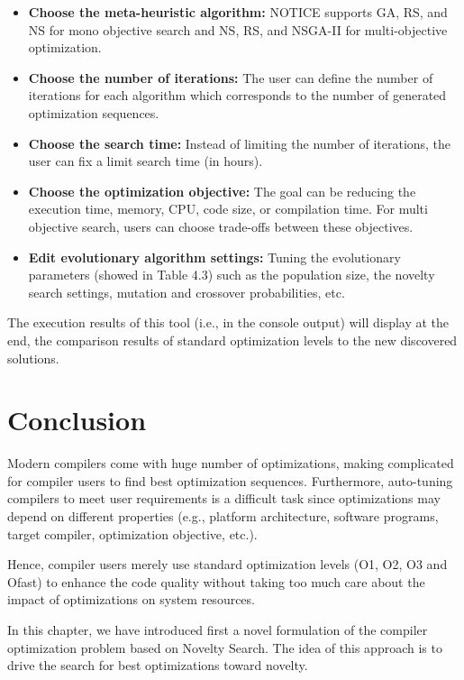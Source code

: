 \begin{itemize}
	\item \textbf{Choose the meta-heuristic algorithm:} NOTICE supports GA, RS, and NS for mono objective search and NS, RS, and NSGA-II for multi-objective optimization.
 	
	\item \textbf{Choose the number of iterations:} The user can define the number of iterations for each algorithm which corresponds to the number of generated optimization sequences.

	\item \textbf{Choose the search time:} Instead of limiting the number of iterations, the user can fix a limit search time (in hours). 
	
	\item \textbf{Choose the optimization objective:} The goal can be reducing the execution time, memory, CPU, code size, or compilation time. For multi objective search, users can choose trade-offs between these objectives.
	
	\item \textbf{Edit evolutionary algorithm settings:} Tuning the evolutionary parameters (showed in Table 4.3) such as the population size, the novelty search settings, mutation and crossover probabilities, etc.
\end{itemize} 


The execution results of this tool (i.e., in the console output) will display at the end, the comparison results of standard optimization levels to the new discovered solutions.

\section{Conclusion}
Modern compilers come with huge number of optimizations, making complicated for compiler users to find best optimization sequences. Furthermore, auto-tuning compilers to meet user requirements is a difficult task since optimizations may depend on different properties (e.g., platform architecture, software programs, target compiler, optimization objective, etc.).

Hence, compiler users merely use standard optimization levels (O1, O2, O3 and Ofast) to enhance the code quality without taking too much care about the impact of optimizations on system resources.

In this chapter, we have introduced first a novel formulation of the compiler optimization problem based on Novelty Search. The idea of this approach is to drive the search for best optimizations toward novelty. 


